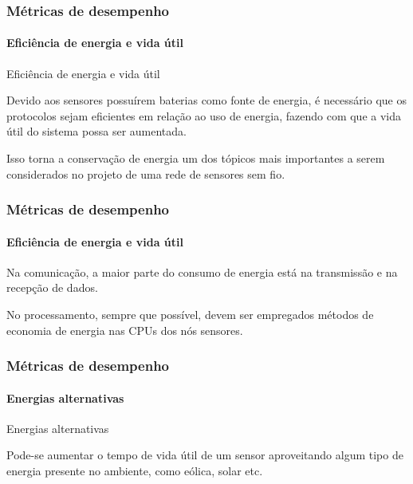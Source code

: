 \documentclass[notes]{beamer}
\begin{document}
\begin{frame}
\label{slide_24}
\frametitle{Métricas de desempenho}
\framesubtitle{Eficiência de energia e vida útil}

\begin{block}{Eficiência de energia e vida útil}

Devido aos sensores possuírem baterias como fonte de energia, é necessário que os protocolos sejam eficientes em relação ao uso de energia, fazendo com que a vida útil do sistema possa ser aumentada. 
\end{block} \pause

\begin{alertblock}

Isso torna a conservação de energia um dos tópicos mais importantes a serem considerados no projeto de uma rede de sensores sem fio.

\end{alertblock}

\end{frame}

\begin{frame}
\label{slide_25}
\frametitle{Métricas de desempenho}
\framesubtitle{Eficiência de energia e vida útil}

\begin{block}

Na comunicação, a maior parte do consumo de energia está na transmissão e na recepção de dados. 

\end{block} \pause

\begin{block}

No processamento, sempre que possível, devem ser empregados métodos de economia de energia nas CPUs dos nós sensores.

\end{block}

\end{frame}

\begin{frame}
\label{slide_26}
\frametitle{Métricas de desempenho}
\framesubtitle{Energias alternativas}

\begin{block}{Energias alternativas}

Pode-se aumentar o tempo de vida útil de um sensor aproveitando algum tipo de energia presente no ambiente, como eólica, solar etc. 

\end{block}

\end{frame}
\end{document}
